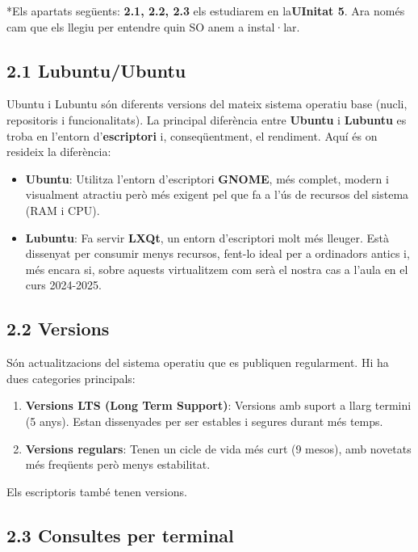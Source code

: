 \documentclass[
  12 pt,
  a4paper,
]{article}
\providecommand{\tightlist}{%
  \setlength{\itemsep}{0pt}\setlength{\parskip}{0pt}}
\begin{document}
*Els apartats següents: \textbf{2.1, 2.2, 2.3} els estudiarem en
la\textbf{UInitat 5}. Ara només cam que els llegiu per entendre quin SO
anem a instal·lar.

\subsection{2.1 Lubuntu/Ubuntu}\label{lubuntuubuntu}

Ubuntu i Lubuntu són diferents versions del mateix sistema operatiu base
(nucli, repositoris i funcionalitats). La principal diferència entre
\textbf{Ubuntu} i \textbf{Lubuntu} es troba en l'entorn
d'\textbf{escriptori} i, conseqüentment, el rendiment. Aquí és on
resideix la diferència:

\begin{itemize}
\item
  \textbf{Ubuntu}: Utilitza l'entorn d'escriptori \textbf{GNOME}, més
  complet, modern i visualment atractiu però més exigent pel que fa a
  l'ús de recursos del sistema (RAM i CPU).
\item
  \textbf{Lubuntu}: Fa servir \textbf{LXQt}, un entorn d'escriptori molt
  més lleuger. Està dissenyat per consumir menys recursos, fent-lo ideal
  per a ordinadors antics i, més encara si, sobre aquests virtualitzem
  com serà el nostra cas a l'aula en el curs 2024-2025.
\end{itemize}

\subsection{2.2 Versions}\label{versions}

Són actualitzacions del sistema operatiu que es publiquen regularment.
Hi ha dues categories principals:

\begin{enumerate}
\def\labelenumi{\arabic{enumi}.}
\tightlist
\item
  \textbf{Versions LTS (Long Term Support)}: Versions amb suport a llarg
  termini (5 anys). Estan dissenyades per ser estables i segures durant
  més temps.
\item
  \textbf{Versions regulars}: Tenen un cicle de vida més curt (9 mesos),
  amb novetats més freqüents però menys estabilitat.
\end{enumerate}

Els escriptoris també tenen versions.

\subsection{2.3 Consultes per terminal}\label{consultes-per-terminal}
\end{document}
